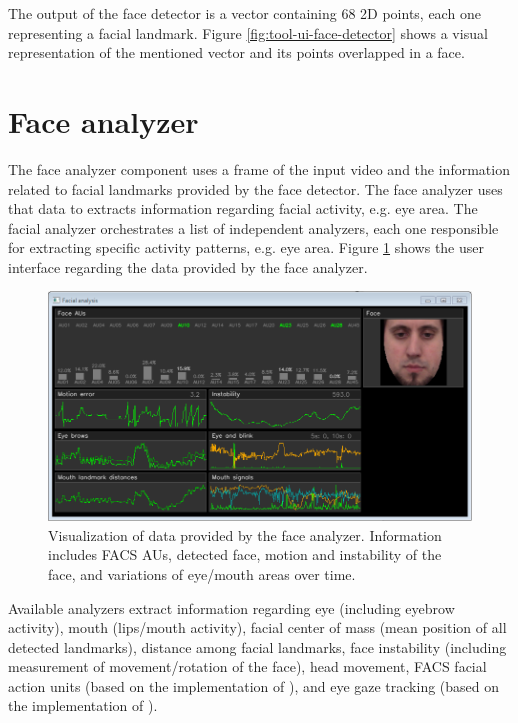 The output of the face detector is a vector containing 68 2D points, each one representing a facial landmark. Figure \ref{fig:tool-ui-face-detector} shows a visual representation of the mentioned vector and its points overlapped in a face.

\section{Face analyzer}

The face analyzer component uses a frame of the input video and the information related to facial landmarks provided by the face detector. The face analyzer uses that data to extracts information regarding facial activity, e.g. eye area. The facial analyzer orchestrates a list of independent analyzers, each one responsible for extracting specific activity patterns, e.g. eye area. Figure \ref{fig:tool-ui-face-analyzer} shows the user interface regarding the data provided by the face analyzer.

\begin{figure}
    \centering
    \includegraphics[width=\textwidth]{figures/tool-ui-face-analyzer.png}
    \caption{Visualization of data provided by the face analyzer. Information includes FACS AUs, detected face, motion and instability of the face, and variations of eye/mouth areas over time.}
    \label{fig:tool-ui-face-analyzer}
\end{figure}

Available analyzers extract information regarding eye (including eyebrow activity), mouth (lips/mouth activity), facial center of mass (mean position of all detected landmarks), distance among facial landmarks, face instability (including measurement of movement/rotation of the face), head movement, FACS facial action units (based on the implementation of \textcite{baltruvsaitis2015cross}), and eye gaze tracking (based on the implementation of \textcite{wood2015rendering}).

